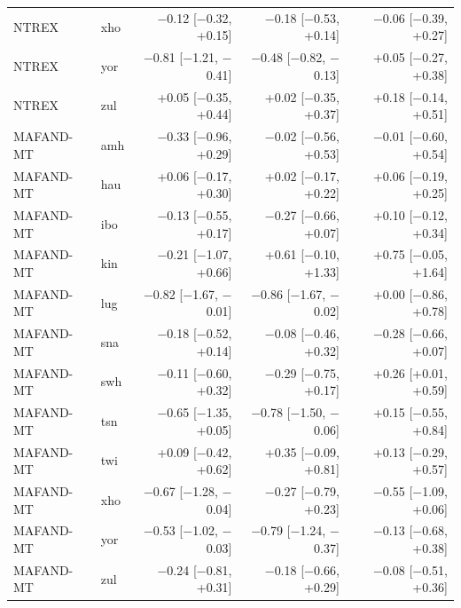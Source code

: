 {\begin{longtable}{@{}llrrr@{}}
NTREX & xho & $-$0.12 [$-$0.32, +0.15] & $-$0.18 [$-$0.53, +0.14] & $-$0.06 [$-$0.39, +0.27] \\
NTREX & yor & $-$0.81 [$-$1.21, $-$0.41] & $-$0.48 [$-$0.82, $-$0.13] & +0.05 [$-$0.27, +0.38] \\
NTREX & zul & +0.05 [$-$0.35, +0.44] & +0.02 [$-$0.35, +0.37] & +0.18 [$-$0.14, +0.51] \\
MAFAND-MT & amh & $-$0.33 [$-$0.96, +0.29] & $-$0.02 [$-$0.56, +0.53] & $-$0.01 [$-$0.60, +0.54] \\
MAFAND-MT & hau & +0.06 [$-$0.17, +0.30] & +0.02 [$-$0.17, +0.22] & +0.06 [$-$0.19, +0.25] \\
MAFAND-MT & ibo & $-$0.13 [$-$0.55, +0.17] & $-$0.27 [$-$0.66, +0.07] & +0.10 [$-$0.12, +0.34] \\
MAFAND-MT & kin & $-$0.21 [$-$1.07, +0.66] & +0.61 [$-$0.10, +1.33] & +0.75 [$-$0.05, +1.64] \\
MAFAND-MT & lug & $-$0.82 [$-$1.67, $-$0.01] & $-$0.86 [$-$1.67, $-$0.02] & +0.00 [$-$0.86, +0.78] \\
MAFAND-MT & sna & $-$0.18 [$-$0.52, +0.14] & $-$0.08 [$-$0.46, +0.32] & $-$0.28 [$-$0.66, +0.07] \\
MAFAND-MT & swh & $-$0.11 [$-$0.60, +0.32] & $-$0.29 [$-$0.75, +0.17] & +0.26 [+0.01, +0.59] \\
MAFAND-MT & tsn & $-$0.65 [$-$1.35, +0.05] & $-$0.78 [$-$1.50, $-$0.06] & +0.15 [$-$0.55, +0.84] \\
MAFAND-MT & twi & +0.09 [$-$0.42, +0.62] & +0.35 [$-$0.09, +0.81] & +0.13 [$-$0.29, +0.57] \\
MAFAND-MT & xho & $-$0.67 [$-$1.28, $-$0.04] & $-$0.27 [$-$0.79, +0.23] & $-$0.55 [$-$1.09, +0.06] \\
MAFAND-MT & yor & $-$0.53 [$-$1.02, $-$0.03] & $-$0.79 [$-$1.24, $-$0.37] & $-$0.13 [$-$0.68, +0.38] \\
MAFAND-MT & zul & $-$0.24 [$-$0.81, +0.31] & $-$0.18 [$-$0.66, +0.29] & $-$0.08 [$-$0.51, +0.36] \\
\end{longtable}}
